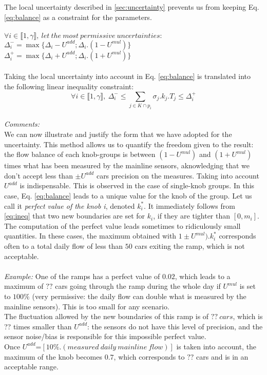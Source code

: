 The local uncertainty described in \ref{sec:uncertainty} prevents us from keeping Eq. \ref{eq:balance} as a constraint for the parameters.\\
\\
$\forall i \in {\llbracket 1,\gamma \rrbracket},\ let\ the\ most\ permissive\ uncertainties:$\\
$\Delta_{i}^{-}=\max{\{\Delta_{i}-U^{add};\Delta_{i}.(1-U^{mul})\}}$\\
$\Delta_{i}^{+}=\max{\{\Delta_{i}+U^{add};\Delta_{i}.(1+U^{mul})\}}$\\
\\
Taking the local uncertainty into account in Eq. \ref{eq:balance} is translated into the following linear inequality constraint:
\begin{equation}
\label{eq:ineq}
	\forall i\in \llbracket 1,\gamma \rrbracket,\ \Delta_{i}^{-}\leq \sum\limits_{j\in K\cap p_{i}}\sigma_{j}.k_{j}.T_{j} \leq \Delta_{i}^{+}
\end{equation}
\\
\emph{Comments:}\\
We can now illustrate and justify the form that we have adopted for the uncertainty. This method allows us to quantify the freedom given to the result: the flow balance of each knob-groups is between $(1-U^{mul})$ and $(1+U^{mul})$ times what has been measured by the mainline sensors, aknowledging that we don't accept less than $\pm U^{add}$ cars precision on the measures.
Taking into account $U^{add}$ is indispensable. This is observed in the case of single-knob groups. In this case, Eq. \ref{eq:balance} leads to a unique value for the knob of the group. Let us call it \emph{perfect value of the knob i}, denoted $k_{i}^{*}$. It immediately follows from \ref{eq:ineq} that two new boundaries are set for $k_{i}$, if they are tighter than $[0,m_{i}]$.  The computation of the perfect value leads sometimes to ridiculously small quantities. In these cases, the maximum obtained with $1\pm U^{mul}).k_{i}^{*}$ corresponds often to a total daily flow of less than $50$ cars exiting the ramp, which is not acceptable.\\ 
\\
\emph{Example:} One of the ramps has a perfect value of $0.02$, which leads to a maximum of $??$ cars going through the ramp during the whole day if $U^{mul}$ is set to $100\%$ (very permissive: the daily flow can double what is measured by the mainline sensors). This is too small for any scenario.\\ The fluctuation allowed by the new boundaries of this ramp is of $??\ cars$, which is ?? times smaller than $U^{add}$: the sensors do not have this level of precision, and the sensor noise/bias is responsible for this impossible perfect value. \\
Once $U^{add}$=$[10\%.(measured\ daily\ mainline\ flow)]$ is taken into account, the maximum of the knob becomes $0.7$, which corresponds to $??$ cars and is in an acceptable range.\\